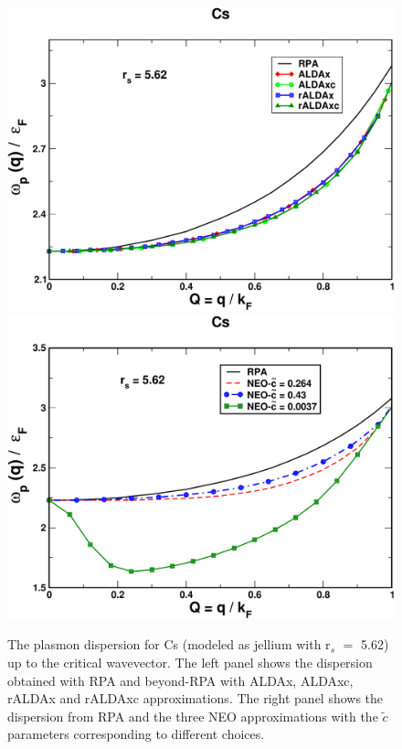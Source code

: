 \documentclass[aps,amsmath,amssymb, preprint, 12pt]{revtex4-1}
\begin{document}
\begin{figure}[h!]	
	\includegraphics[scale=0.3]{figure_5.pdf}
	\includegraphics[scale=0.3]{figure_6.pdf}
	\caption{The plasmon dispersion for Cs (modeled as jellium with r$_s$ $=$ 5.62) up to the critical wavevector. The left panel shows the dispersion obtained with RPA and beyond-RPA with ALDAx, ALDAxc, rALDAx and rALDAxc approximations. The right panel shows the dispersion from RPA and the three NEO approximations with the $\widetilde{c}$ parameters corresponding to different choices.}
	\label{fig3}
\end{figure}


\end{document}
